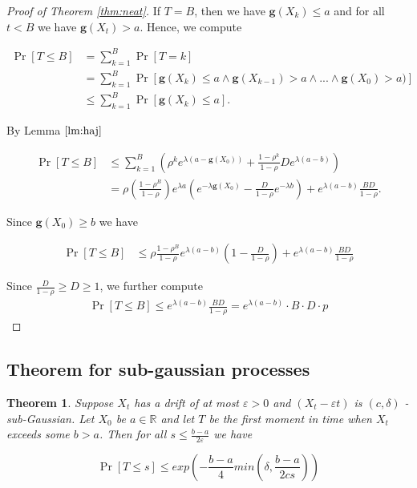 \documentclass[12pt, a4paper]{article}
\newcommand{\gfun}{\mathbf{g}}
\newtheorem{theorem}{Theorem}[section]
\theoremstyle{remark}
\begin{document}
\begin{proof}[Proof of Theorem \ref{thm:neat}]

    If $T = B$, then we have $\gfun(X_k) \leq a$ and for all $t < B$ we have $\gfun(X_t) > a$. Hence, we compute

    \begin{align*}
        \Pr[T \leq B] & = \sum_{k=1}^{B} \Pr[T = k]                                                                        \\
                      & = \sum_{k=1}^{B} \Pr[\gfun(X_k) \leq a \land \gfun(X_{k - 1}) > a \land ... \land \gfun(X_0) > a)] \\
                      & \leq \sum_{k=1}^{B} \Pr[\gfun(X_k) \leq a].
    \end{align*}

    By Lemma $\ref{lm:haj}$

    \begin{align*}
        \Pr[T \leq B] & \leq \sum_{k=1}^{B} \left(\rho^k e^{\lambda(a - \gfun(X_0))} + \frac{1 - \rho^k}{1 - \rho} D e^{\lambda(a - b)}\right)                                                          \\
                      & = \rho \left(\frac{1 - \rho^B}{1 - \rho}\right) e^{\lambda a}\left(e^{-\lambda\gfun(X_0)} - \frac{D}{1 - \rho} e^{-\lambda b}\right) + e^{\lambda(a - b)} \frac{B D}{1 - \rho}.
    \end{align*}

    Since $\gfun(X_0) \ge b$ we have

    \begin{align*}
        \Pr[T \leq B] & \leq \rho \frac{1 - \rho^B}{1 - \rho} e^{\lambda (a - b)}\left(1 - \frac{D}{1 - \rho}\right) + e^{\lambda(a - b)} \frac{B D}{1 - \rho}
    \end{align*}

    Since $\frac{D}{1 - \rho} \geq D \geq 1 $, we further compute
    \begin{align*}
        \Pr[T \leq B] \leq e^{\lambda(a - b)} \frac{B D}{1 - \rho} = e^{\lambda(a - b)} \cdot B \cdot D \cdot p
    \end{align*}

\end{proof}
\subsection{Theorem for sub-gaussian processes}

\begin{theorem}
    Suppose $X_t$ has a drift of at most $\varepsilon > 0$ and $(X_t - \varepsilon t)$ is $(c, \delta)$ - sub-Gaussian. Let \(X_0\) be \(a \in \mathbb{R}\) and let \(T\) be the first moment in time when \(X_t\) exceeds some \(b > a\). Then for all \(s \leq \frac{b - a}{2\varepsilon}\) we have

    \[\Pr[T \leq s] \leq exp\left(-\frac{b - a}{4} min\left(\delta, \frac{b - a}{2cs}\right)\right)\]
\end{theorem}
\end{document}
